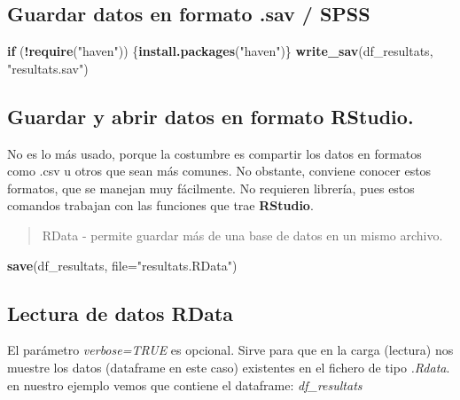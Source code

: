 \documentclass[
]{article}
\newenvironment{Shaded}{\begin{snugshade}}{\end{snugshade}}
\newcommand{\AttributeTok}[1]{\textcolor[rgb]{0.13,0.29,0.53}{#1}}
\newcommand{\ControlFlowTok}[1]{\textcolor[rgb]{0.13,0.29,0.53}{\textbf{#1}}}
\newcommand{\FunctionTok}[1]{\textcolor[rgb]{0.13,0.29,0.53}{\textbf{#1}}}
\newcommand{\NormalTok}[1]{#1}
\newcommand{\SpecialCharTok}[1]{\textcolor[rgb]{0.81,0.36,0.00}{\textbf{#1}}}
\newcommand{\StringTok}[1]{\textcolor[rgb]{0.31,0.60,0.02}{#1}}
\begin{document}
\hypertarget{guardar-datos-en-formato-.sav-spss}{%
\subsection{Guardar datos en formato .sav /
SPSS}\label{guardar-datos-en-formato-.sav-spss}}

\begin{Shaded}
\begin{Highlighting}[]
\ControlFlowTok{if}\NormalTok{ (}\SpecialCharTok{!}\FunctionTok{require}\NormalTok{(}\StringTok{"haven"}\NormalTok{)) \{}\FunctionTok{install.packages}\NormalTok{(}\StringTok{"haven"}\NormalTok{)\}}
\FunctionTok{write\_sav}\NormalTok{(df\_resultats, }\StringTok{"resultats.sav"}\NormalTok{)}
\end{Highlighting}
\end{Shaded}

\hypertarget{guardar-y-abrir-datos-en-formato-rstudio.}{%
\subsection{Guardar y abrir datos en formato
RStudio.}\label{guardar-y-abrir-datos-en-formato-rstudio.}}

No es lo más usado, porque la costumbre es compartir los datos en
formatos como .csv u otros que sean más comunes. No obstante, conviene
conocer estos formatos, que se manejan muy fácilmente. No requieren
librería, pues estos comandos trabajan con las funciones que trae
\textbf{RStudio}.

\begin{quote}
RData - permite guardar más de una base de datos en un mismo archivo.
\end{quote}

\begin{Shaded}
\begin{Highlighting}[]
\FunctionTok{save}\NormalTok{(df\_resultats, }\AttributeTok{file=}\StringTok{"resultats.RData"}\NormalTok{)}
\end{Highlighting}
\end{Shaded}

\hypertarget{lectura-de-datos-rdata}{%
\subsection{Lectura de datos RData}\label{lectura-de-datos-rdata}}

El parámetro \emph{verbose=TRUE} es opcional. Sirve para que en la carga
(lectura) nos muestre los datos (dataframe en este caso) existentes en
el fichero de tipo \emph{.Rdata}. en nuestro ejemplo vemos que contiene
el dataframe: \emph{df\_resultats}
\end{document}
